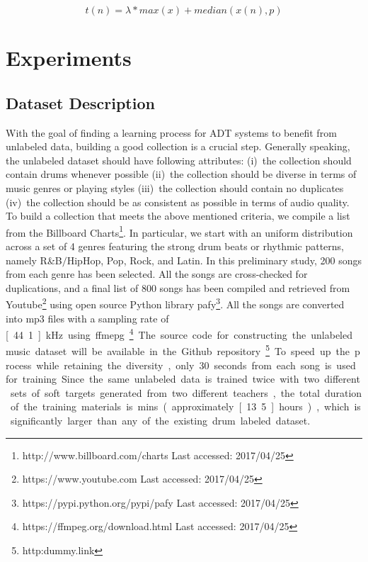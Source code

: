\documentclass{article}
\begin{document}
\begin{equation}\label{eq:medianThres}
t(n) = \lambda * max(x) + median(x(n), p)
\end{equation} 

\section{Experiments}\label{sec:experiments}

\subsection{Dataset Description}
With the goal of finding a learning process for ADT systems to benefit from unlabeled data, building a good collection is a crucial step. Generally speaking, the unlabeled dataset should have following attributes: (i)~the collection should contain drums whenever possible (ii)~the collection should be diverse in terms of music genres or playing styles (iii)~the collection should contain no duplicates (iv)~the collection should be as consistent as possible in terms of audio quality. To build a collection that meets the above mentioned criteria, we compile a list from the Billboard Charts\footnote{http://www.billboard.com/charts Last accessed: 2017/04/25}. In particular, we start with an uniform distribution across a set of 4 genres featuring the strong drum beats or rhythmic patterns, namely R\&B$\slash$HipHop, Pop, Rock, and Latin. In this preliminary study, 200 songs from each genre has been selected. All the songs are cross-checked for duplications, and a final list of 800 songs has been compiled and retrieved from Youtube\footnote{https://www.youtube.com Last accessed: 2017/04/25} using open source Python library pafy\footnote{https://pypi.python.org/pypi/pafy Last accessed: 2017/04/25}. All the songs are converted into mp3 files with a sampling rate of \unit[44.1]{kHz} using ffmepg\footnote{https://ffmpeg.org/download.html Last accessed: 2017/04/25}. The source code for constructing the unlabeled music dataset will be available in the Github repository\footnote{http:dummy.link}. To speed up the process while retaining the diversity, only 30 seconds from each song is used for training. Since the same unlabeled data is trained twice with two different sets of soft targets generated from two different teachers, the total duration of the training materials is \unit[800]{mins} (approximately \unit[13.5]{hours}), which is significantly larger than any of the existing drum labeled dataset. 
\end{document}
